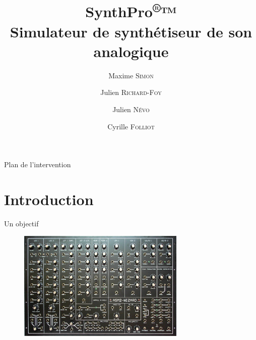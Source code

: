 \documentclass[frenchb]{beamer}
\title[SynthPro®™]{SynthPro\textsuperscript{®}™\\Simulateur de synthétiseur de son analogique}
\author[BackSynth Boys]{Maxime \textsc{Simon}\and Julien \textsc{Richard-Foy}\and Julien \textsc{Névo} \and Cyrille \textsc{Folliot}}
\institute[ISTIC]{Université de Rennes 1}
\begin{document}
\begin{frame}
    \titlepage
\end{frame}
	
	
\begin{frame}{Plan de l'intervention}
    \tableofcontents
\end{frame}


\section{Introduction}


\begin{frame}{Un objectif}
    \begin{figure}
        \includegraphics[width=8cm ]{../img/png/synth.jpg}
    \end{figure}
\end{frame}
\end{document}
